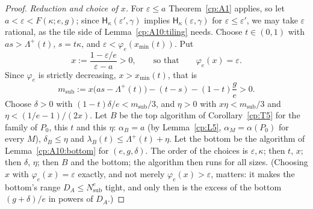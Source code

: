 \documentclass[11pt]{article}
\theoremstyle{definition}
\theoremstyle{remark}
\providecommand{\eps}{\varepsilon}
\newcommand{\Hypk}[1]{\mathsf{H}_{#1}}        %
\newcommand{\lamB}{\lambda_B}                 %
\newcommand{\delB}{\delta_B}                  %
\newcommand{\alB}{\alpha_B}                   %
\newcommand{\Lamp}{\Lambda^{+}}               %
\newcommand{\xmin}{x_{\min}}                  %
\newcommand{\Pzero}{P_0}                      %
\begin{document}
\begin{proof}
\emph{Reduction and choice of $x$.} For $\eps\le a$ Theorem~\ref{cp:A1} applies, so let $a<\eps<F(\kappa;e,g)$; since $\Hypk\kappa(\eps',\gamma)$ implies $\Hypk\kappa(\eps,\gamma)$ for $\eps\le\eps'$, we may take $\eps$ rational, as the tile side of Lemma~\ref{cp:A10:tiling} needs. Choose $t\in(0,1)$ with $as>\Lamp(t)$, $s=t\kappa$, and $\eps<\varphi_e(\xmin(t))$. Put
\[
x:=\frac{1-\eps/e}{\eps-a}>0,\qquad\text{so that}\qquad\varphi_e(x)=\eps .
\]
Since $\varphi_e$ is strictly decreasing, $x>\xmin(t)$, that is
\[
m_{\mathrm{sub}}:=x\bigl(as-\Lamp(t)\bigr)-(t-s)-(1-t)\frac ge>0 .
\]
Choose $\delta>0$ with $(1-t)\delta/e<m_{\mathrm{sub}}/3$, and $\eta>0$ with $x\eta<m_{\mathrm{sub}}/3$ and $\eta<(1/e-1)/(2x)$. Let $B$ be the top algorithm of Corollary~\ref{cp:T5} for the family of $\Pzero$, this $t$ and this $\eta$: $\alB=a$ (by Lemma~\ref{cp:L5}, $\alpha_M=\alpha(\Pzero)$ for every $M$), $\delB\le\eta$ and $\lamB(t)\le\Lamp(t)+\eta$. Let the bottom be the algorithm of Lemma~\ref{cp:A10:bottom} for $(e,g,\delta)$. The order of the choices is $\eps,\kappa$; then $t$, $x$; then $\delta$, $\eta$; then $B$ and the bottom; the algorithm then runs for all sizes. (Choosing $x$ with $\varphi_e(x)=\eps$ exactly, and not merely $\varphi_e(x)>\eps$, matters: it makes the bottom's range $D_A\le N_{\mathrm{sub}}^e$ tight, and only then is the excess of the bottom $(g+\delta)/e$ in powers of $D_A$.)


\end{proof}
\end{document}
